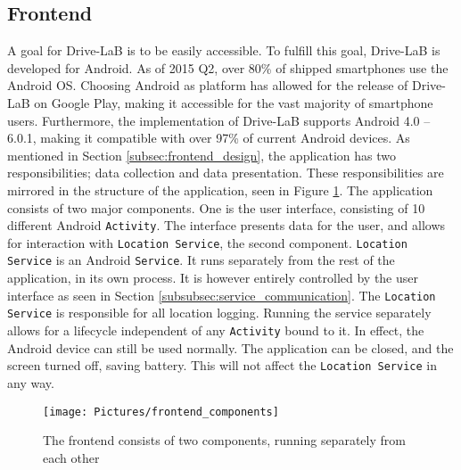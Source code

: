 \subsection{Frontend}\label{subsec:frontend_implementation}
A goal for Drive-LaB is to be easily accessible. To fulfill this goal, Drive-LaB is developed for Android. As of 2015 Q2, over 80\% of shipped smartphones use the Android OS\citep{smartphone_market_share}. Choosing Android as platform has allowed for the release of Drive-LaB on Google Play\citep{google_play_drivelab}, making it accessible for the vast majority of smartphone users. Furthermore, the implementation of Drive-LaB supports Android 4.0 – 6.0.1, making it compatible with over 97\% of current Android devices\citep{android_version_distribution}.
As mentioned in Section \ref{subsec:frontend_design}, the application has two responsibilities; data collection and data presentation. These responsibilities are mirrored in the structure of the application, seen in Figure \ref{fig:frontend_components}. The application consists of two major components. One is the user interface, consisting of 10 different Android \texttt{Activity}\citep{android_activity}. The interface presents data for the user, and allows for interaction with \texttt{Location Service}, the second component. \texttt{Location Service} is an Android \texttt{Service}\citep{android_service}. It runs separately from the rest of the application, in its own process. It is however entirely controlled by the user interface as seen in Section \ref{subsubsec:service_communication}. The \texttt{Location Service} is responsible for all location logging. Running the service separately allows for a lifecycle independent of any \texttt{Activity} bound to it. In effect, the Android device can still be used normally. The application can be closed, and the screen turned off, saving battery. This will not affect the \texttt{Location Service} in any way.

\begin{figure}[tb]
\centering
\texttt{[image: Pictures/frontend\_components]}
\caption{The frontend consists of two components, running separately from each other}
\label{fig:frontend_components}
\end{figure}

